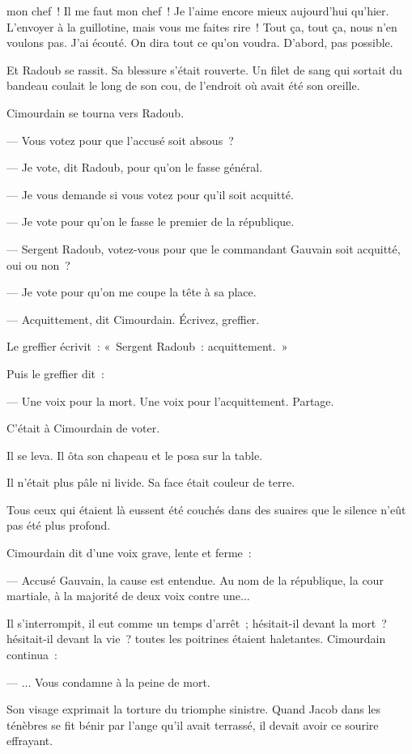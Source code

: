 \documentclass[french,twoside]{book} %
\begin{document}
mon chef ! Il me faut mon chef ! Je l’aime encore mieux aujourd’hui qu’hier. L’envoyer à la guillotine, mais vous me faites rire ! Tout ça, tout ça, nous n’en voulons pas. J’ai écouté. On dira tout ce qu’on voudra. D’abord, pas possible.\par
Et Radoub se rassit. Sa blessure s’était rouverte. Un filet de sang qui sortait du bandeau coulait le long de son cou, de l’endroit où avait été son oreille.\par
Cimourdain se tourna vers Radoub.\par
— Vous votez pour que l’accusé soit absous ?\par
— Je vote, dit Radoub, pour qu’on le fasse général.\par
— Je vous demande si vous votez pour qu’il soit acquitté.\par
— Je vote pour qu’on le fasse le premier de la république.\par
— Sergent Radoub, votez-vous pour que le commandant Gauvain soit acquitté, oui ou non ?\par
— Je vote pour qu’on me coupe la tête à sa place.\par
 — Acquittement, dit Cimourdain. Écrivez, greffier.\par
Le greffier écrivit : « Sergent Radoub : acquittement. »\par
Puis le greffier dit :\par
— Une voix pour la mort. Une voix pour l’acquittement. Partage.\par
C’était à Cimourdain de voter.\par
Il se leva. Il ôta son chapeau et le posa sur la table.\par
Il n’était plus pâle ni livide. Sa face était couleur de terre.\par
Tous ceux qui étaient là eussent été couchés dans des suaires que le silence n’eût pas été plus profond.\par
Cimourdain dit d’une voix grave, lente et ferme :\par
— Accusé Gauvain, la cause est entendue. Au nom de la république, la cour martiale, à la majorité de deux voix contre une...\par
Il s’interrompit, il eut comme un temps d’arrêt ; hésitait-il devant la mort ? hésitait-il devant la vie ? toutes les poitrines étaient haletantes. Cimourdain continua :\par
— ... Vous condamne à la peine de mort.\par
Son visage exprimait la torture du triomphe sinistre. Quand Jacob dans les ténèbres se fit bénir par l’ange qu’il avait terrassé, il devait avoir ce sourire effrayant.\par
\end{document}
